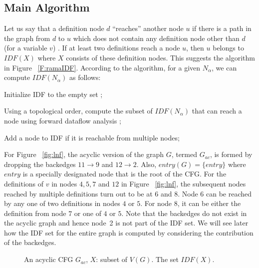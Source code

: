{    \subsection{Main Algorithm}
    
Let us say that a definition node $d$ ``reaches'' another node $u$ if there is a path in the graph from $d$ to $u$ which does not contain any definition node other than $d$ (for a variable $v$) . If at least two definitions reach a node $u$, then $u$ belongs to $IDF(X)$ where $X$ consists of these definition nodes. This suggests the algorithm in Figure ~\ref{F:ramaIDF}. According to the algorithm, for a given $N_{\alpha}$, we can compute $IDF(N_{\alpha})$ as follows:
\begin{itemize}
\item { Initialize IDF to the empty set };
\item { Using a topological order, compute the subset of $IDF(N_{\alpha})$ that can reach a node using forward dataflow analysis };
{\item} {Add a node to IDF if it is reachable from multiple nodes};
\end{itemize}  

    For Figure ~\ref{fig:lnf}, the acyclic version of the graph $G$, termed $G_{ac}$, is formed by dropping the backedges $11 \rightarrow 9$ and $12 \rightarrow 2$. Also, $entry(G) = \{entry\}$ where $entry$ is a specially designated node that is the root of the CFG. For the definitions of $v$ in nodes $4,5,7$ and $12$ in Figure ~\ref{fig:lnf}, the subsequent nodes reached by multiple definitions turn out to be at $6$ and $8$. Node $6$ can be reached by any one of two definitions in nodes $4$ or $5$. For node $8$, it can be either the definition from node $7$ or one of $4$ or $5$. Note that the backedges do not exist in the acyclic graph and hence node~2 is not part of the IDF set. We will see later how the IDF set for the entire graph is computed by considering the contribution of the backedges. 



    
   \begin{figure}[!ht]
   \centering
  \begin{minipage}[t]{5in}
   An acyclic CFG $G_{ac}$, $X$: subset of $V(G)$.
   The set $IDF(X)$.
  \setcounter{linectr}{0}


\end{minipage}
\end{figure}}
